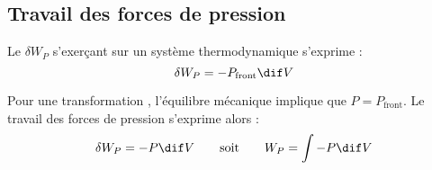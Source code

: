 \subsection{Travail des forces de pression}

\begin{propriete}
Le  $\delta W_P$ s'exerçant sur un système thermodynamique s'exprime :
\[\delta W_P = -P_{\mathrm{front}} \dif V\]
\end{propriete}

\begin{propriete}
Pour une transformation , l'équilibre mécanique implique que $P = P_{\mathrm{front}}$. Le travail des forces de pression s'exprime alors :
\[\delta W_P = -P \dif V \qquad \text{soit} \qquad W_P = \int -P \dif V\]
\end{propriete}

